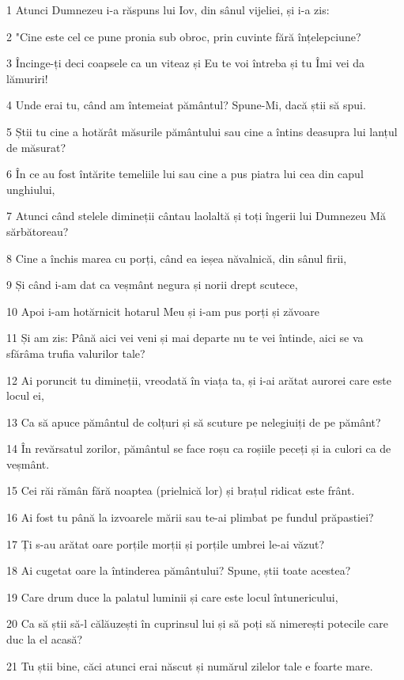 \par 1 Atunci Dumnezeu i-a răspuns lui Iov, din sânul vijeliei, și i-a zis:
\par 2 "Cine este cel ce pune pronia sub obroc, prin cuvinte fără înțelepciune?
\par 3 Încinge-ți deci coapsele ca un viteaz și Eu te voi întreba și tu Îmi vei da lămuriri!
\par 4 Unde erai tu, când am întemeiat pământul? Spune-Mi, dacă știi să spui.
\par 5 Știi tu cine a hotărât măsurile pământului sau cine a întins deasupra lui lanțul de măsurat?
\par 6 În ce au fost întărite temeliile lui sau cine a pus piatra lui cea din capul unghiului,
\par 7 Atunci când stelele dimineții cântau laolaltă și toți îngerii lui Dumnezeu Mă sărbătoreau?
\par 8 Cine a închis marea cu porți, când ea ieșea năvalnică, din sânul firii,
\par 9 Și când i-am dat ca veșmânt negura și norii drept scutece,
\par 10 Apoi i-am hotărnicit hotarul Meu și i-am pus porți și zăvoare
\par 11 Și am zis: Până aici vei veni și mai departe nu te vei întinde, aici se va sfărâma trufia valurilor tale?
\par 12 Ai poruncit tu dimineții, vreodată în viața ta, și i-ai arătat aurorei care este locul ei,
\par 13 Ca să apuce pământul de colțuri și să scuture pe nelegiuiți de pe pământ?
\par 14 În revărsatul zorilor, pământul se face roșu ca roșiile peceți și ia culori ca de veșmânt.
\par 15 Cei răi rămân fără noaptea (prielnică lor) și brațul ridicat este frânt.
\par 16 Ai fost tu până la izvoarele mării sau te-ai plimbat pe fundul prăpastiei?
\par 17 Ți s-au arătat oare porțile morții și porțile umbrei le-ai văzut?
\par 18 Ai cugetat oare la întinderea pământului? Spune, știi toate acestea?
\par 19 Care drum duce la palatul luminii și care este locul întunericului,
\par 20 Ca să știi să-l călăuzești în cuprinsul lui și să poți să nimerești potecile care duc la el acasă?
\par 21 Tu știi bine, căci atunci erai născut și numărul zilelor tale e foarte mare.
